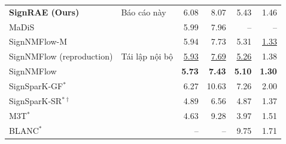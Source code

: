 \begin{frame}[t]{}
\begin{tabular}{@{}p{4.45cm}VRRRR@{}}
    \textbf{SignRAE (Ours)} & Báo cáo này & \textcolor{DeepOrange}{6.08} & \textcolor{DeepOrange}{8.07} & \textcolor{DeepOrange}{5.43} & \textcolor{DeepOrange}{1.46} \\
    MaDiS &  & 5.99 & 7.96 & -- & -- \\
    SignNMFlow-M &  & 5.94 & 7.73 & 5.31 & \underline{1.33} \\
    SignNMFlow (reproduction) & Tái lập nội bộ & \underline{5.93} & \underline{7.69} & \underline{5.26} & 1.38 \\
    SignNMFlow &  & \textbf{5.73} & \textbf{7.43} & \textbf{5.10} & \textbf{1.30} \\
    \midrule
    SignSparK-GF\ensuremath{^{*}} &  & 6.27 & 10.63 & 7.26 & 2.00 \\
    SignSparK-SR\ensuremath{^{*\dagger}} &  & 4.89 & 6.56 & 4.87 & 1.37 \\
    M3T\ensuremath{^{*}} &  & 4.63 & 9.28 & 3.97 & 1.51 \\
    BLANC\ensuremath{^{*}} &  & -- & -- & 9.75 & 1.71 \\
    \bottomrule
  \end{tabular}
  \resultnotes{\glossorretrieval}
\end{frame}


